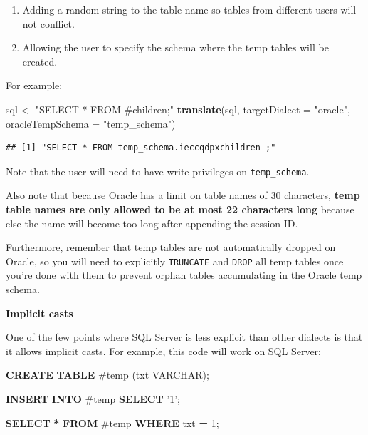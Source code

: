 \documentclass[11pt]{book}
\newenvironment{Shaded}{\begin{snugshade}}{\end{snugshade}}
\newcommand{\DataTypeTok}[1]{\textcolor[rgb]{0.13,0.29,0.53}{#1}}
\newcommand{\DecValTok}[1]{\textcolor[rgb]{0.00,0.00,0.81}{#1}}
\newcommand{\KeywordTok}[1]{\textcolor[rgb]{0.13,0.29,0.53}{\textbf{#1}}}
\newcommand{\NormalTok}[1]{#1}
\newcommand{\OperatorTok}[1]{\textcolor[rgb]{0.81,0.36,0.00}{\textbf{#1}}}
\newcommand{\StringTok}[1]{\textcolor[rgb]{0.31,0.60,0.02}{#1}}
\providecommand{\tightlist}{%
  \setlength{\itemsep}{0pt}\setlength{\parskip}{0pt}}
\theoremstyle{definition}
\theoremstyle{definition}
\theoremstyle{definition}
\theoremstyle{remark}
\begin{document}
\begin{enumerate}
\def\labelenumi{\arabic{enumi}.}
\tightlist
\item
  Adding a random string to the table name so tables from different users will not conflict.
\item
  Allowing the user to specify the schema where the temp tables will be created.
\end{enumerate}

For example:

\begin{Shaded}
\begin{Highlighting}[]
\NormalTok{sql <-}\StringTok{ "SELECT * FROM #children;"}
\KeywordTok{translate}\NormalTok{(sql, }\DataTypeTok{targetDialect =} \StringTok{"oracle"}\NormalTok{, }\DataTypeTok{oracleTempSchema =} \StringTok{"temp_schema"}\NormalTok{)}
\end{Highlighting}
\end{Shaded}

\begin{verbatim}
## [1] "SELECT * FROM temp_schema.ieccqdpxchildren ;"
\end{verbatim}

Note that the user will need to have write privileges on \texttt{temp\_schema}.

Also note that because Oracle has a limit on table names of 30 characters, \textbf{temp table names are only allowed to be at most 22 characters long} because else the name will become too long after appending the session ID.

Furthermore, remember that temp tables are not automatically dropped on Oracle, so you will need to explicitly \texttt{TRUNCATE} and \texttt{DROP} all temp tables once you're done with them to prevent orphan tables accumulating in the Oracle temp schema.

\textbf{Implicit casts}

One of the few points where SQL Server is less explicit than other dialects is that it allows implicit casts. For example, this code will work on SQL Server:

\begin{Shaded}
\begin{Highlighting}[]
\KeywordTok{CREATE} \KeywordTok{TABLE}\NormalTok{ #temp (txt }\DataTypeTok{VARCHAR}\NormalTok{);}

\KeywordTok{INSERT} \KeywordTok{INTO}\NormalTok{ #temp}
\KeywordTok{SELECT} \StringTok{'1'}\NormalTok{;}

\KeywordTok{SELECT} \OperatorTok{*} \KeywordTok{FROM}\NormalTok{ #temp }\KeywordTok{WHERE}\NormalTok{ txt }\OperatorTok{=} \DecValTok{1}\NormalTok{;}
\end{Highlighting}
\end{Shaded}
\end{document}
